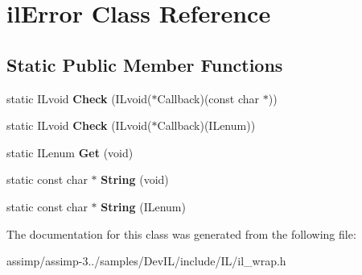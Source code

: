 \hypertarget{classil_error}{\section{il\+Error Class Reference}
\label{classil_error}
}
\subsection*{Static Public Member Functions}
\begin{DoxyCompactItemize}
\item 
\hypertarget{classil_error_a13f846787d3805ce416474d130d5783a}{static I\+Lvoid {\bfseries Check} (I\+Lvoid($\ast$Callback)(const char $\ast$))}\label{classil_error_a13f846787d3805ce416474d130d5783a}

\item 
\hypertarget{classil_error_a6bd14a9274a0d11e2ca7d3ef4c692143}{static I\+Lvoid {\bfseries Check} (I\+Lvoid($\ast$Callback)(I\+Lenum))}\label{classil_error_a6bd14a9274a0d11e2ca7d3ef4c692143}

\item 
\hypertarget{classil_error_abc8609aeeccf03fd651a83775c871821}{static I\+Lenum {\bfseries Get} (void)}\label{classil_error_abc8609aeeccf03fd651a83775c871821}

\item 
\hypertarget{classil_error_a28207cbcb6684824f5af493ae4996d19}{static const char $\ast$ {\bfseries String} (void)}\label{classil_error_a28207cbcb6684824f5af493ae4996d19}

\item 
\hypertarget{classil_error_a34ea6adf752c57d85d607eefec2b58c8}{static const char $\ast$ {\bfseries String} (I\+Lenum)}\label{classil_error_a34ea6adf752c57d85d607eefec2b58c8}

\end{DoxyCompactItemize}


The documentation for this class was generated from the following file\+:\begin{DoxyCompactItemize}
\item 
assimp/assimp-\/3../samples/\+Dev\+I\+L/include/\+I\+L/il\+\_\+wrap.\+h\end{DoxyCompactItemize}
